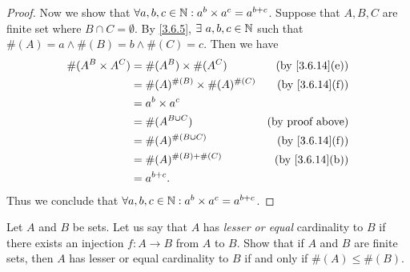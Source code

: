 \begin{proof}
  Now we show that \(\forall a, b, c \in \mathbb{N} : a^b \times a^c = a^{b + c}\).
  Suppose that \(A, B, C\) are finite set where \(B \cap C = \emptyset\).
  By \cref{3.6.5}, \(\exists\ a, b, c \in \N\) such that \(\#(A) = a \land \#(B) = b \land \#(C) = c\).
  Then we have
  \begin{align*}
    \#(A^B \times A^C) & = \#(A^B) \times \#(A^C)             & \text{(by \cref{3.6.14}(e))} \\
                       & = \#(A)^{\#(B)} \times \#(A)^{\#(C)} & \text{(by \cref{3.6.14}(f))} \\
                       & = a^b \times a^c                                                    \\
                       & = \#(A^{B \cup C})                   & \text{(by proof above)}      \\
                       & = \#(A)^{\#(B \cup C)}               & \text{(by \cref{3.6.14}(f))} \\
                       & = \#(A)^{\#(B) + \#(C)}              & \text{(by \cref{3.6.14}(b))} \\
                       & = a^{b + c}.
  \end{align*}
  Thus we conclude that \(\forall a, b, c \in \mathbb{N} : a^b \times a^c = a^{b + c}\).
\end{proof}

\begin{ex}\label{ex:3.6.7}
  Let \(A\) and \(B\) be sets.
  Let us say that \(A\) has \emph{lesser or equal} cardinality to \(B\) if there exists an injection \(f : A \to B\) from \(A\) to \(B\).
  Show that if \(A\) and \(B\) are finite sets, then \(A\) has lesser or equal cardinality to \(B\) if and only if \(\#(A) \leq \#(B)\).
\end{ex}

